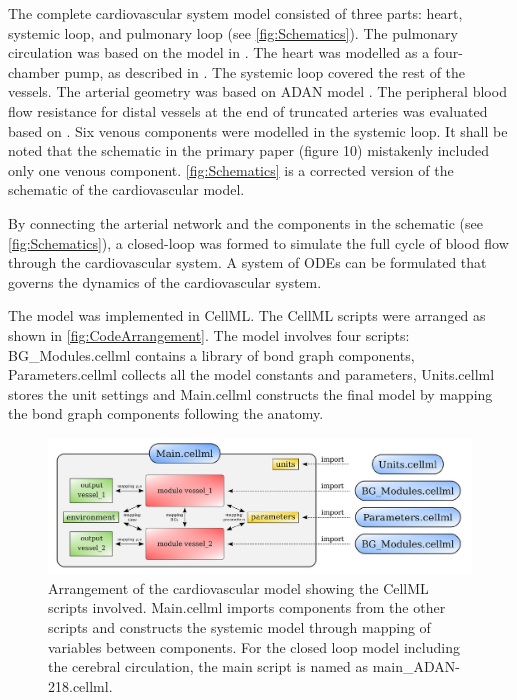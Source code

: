 \documentclass[fleqn,10pt]{physiome}
\begin{document}
The complete cardiovascular system model consisted of three parts: heart, systemic loop, and pulmonary loop (see \autoref{fig:Schematics}). The pulmonary circulation was based on the model in \citet{blanco2013}. The heart was modelled as a four-chamber pump, as described in \citet{safaei2018}. The systemic loop covered the rest of the vessels. The arterial geometry was based on ADAN model \citet{blanco2015}. The peripheral blood flow resistance for distal vessels at the end of truncated arteries was evaluated based on \citet{blanco2014}. Six venous components were modelled in the systemic loop. It shall be noted that the schematic in the primary paper (figure 10) mistakenly included only one venous component. \autoref{fig:Schematics} is a corrected version of the schematic of the cardiovascular model. 

By connecting the arterial network and the components in the schematic (see \autoref{fig:Schematics}), a closed-loop was formed to simulate the full cycle of blood flow through the cardiovascular system. A system of ODEs can be formulated that governs the dynamics of the cardiovascular system. 

The model was implemented in CellML. The CellML scripts were arranged as shown in \autoref{fig:CodeArrangement}. The model involves four scripts: BG\_Modules.cellml contains a library of bond graph components, Parameters.cellml collects all the model constants and parameters, Units.cellml stores the unit settings and Main.cellml constructs the final model by mapping the bond graph components following the anatomy.

\begin{figure}[ht]
\centering
\includegraphics[width=0.9\linewidth]{img/arrangement.jpg}
\caption{Arrangement of the cardiovascular model showing the CellML scripts involved. Main.cellml imports components from the other scripts and constructs the systemic model through mapping of variables between components. For the closed loop model including the cerebral circulation, the main script is named as main\_ADAN-218.cellml.}
\label{fig:CodeArrangement}
\end{figure}
\end{document}
